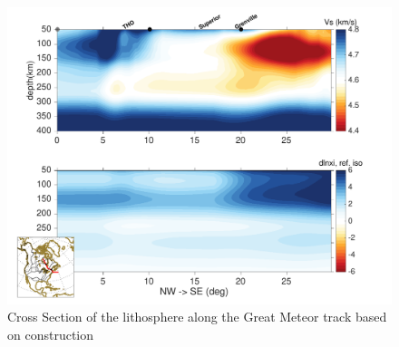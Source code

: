 \documentclass[12pt]{article}
\begin{document}

				



	\begin{figure}
		\centerline{\includegraphics[width=\linewidth]{figures/profiles_NASEM3_vs_dxi_GMTrack.pdf}}

		\caption{Cross Section of the lithosphere along the Great Meteor track based on \cite{heaman2000timing} construction}
		\label{gmtcross}

	\end{figure}
\end{document}
